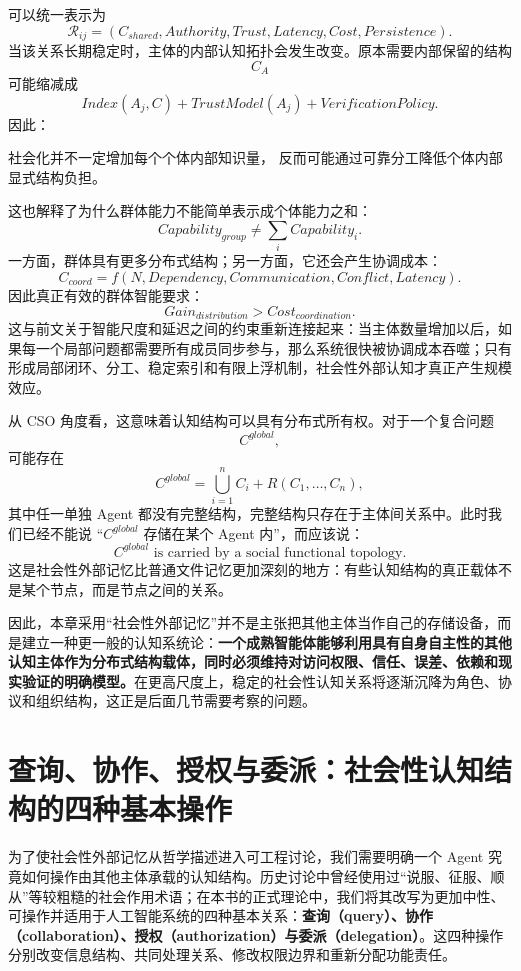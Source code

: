 可以统一表示为
\[
\mathcal R_{ij}
=
(
C_{shared},
Authority,
Trust,
Latency,
Cost,
Persistence
).
\]
当该关系长期稳定时，主体的内部认知拓扑会发生改变。原本需要内部保留的结构
\[
C_A
\]
可能缩减成
\[
Index(A_j,C)
+
TrustModel(A_j)
+
VerificationPolicy.
\]
因此：
\begin{statementbox}
社会化并不一定增加每个个体内部知识量，
反而可能通过可靠分工降低个体内部显式结构负担。
\end{statementbox}

这也解释了为什么群体能力不能简单表示成个体能力之和：
\[
Capability_{group}
\neq
\sum_i Capability_i.
\]
一方面，群体具有更多分布式结构；另一方面，它还会产生协调成本：
\[
C_{coord}
=
f(
N,
Dependency,
Communication,
Conflict,
Latency
).
\]
因此真正有效的群体智能要求：
\[
Gain_{distribution}
>
Cost_{coordination}.
\]
这与前文关于智能尺度和延迟之间的约束重新连接起来：当主体数量增加以后，如果每一个局部问题都需要所有成员同步参与，那么系统很快被协调成本吞噬；只有形成局部闭环、分工、稳定索引和有限上浮机制，社会性外部认知才真正产生规模效应。

从 CSO 角度看，这意味着认知结构可以具有分布式所有权。对于一个复合问题
\[
C^{global},
\]
可能存在
\[
C^{global}
=
\bigcup_{i=1}^{n}
C_i
+
R(C_1,\ldots,C_n),
\]
其中任一单独 Agent 都没有完整结构，完整结构只存在于主体间关系中。此时我们已经不能说 ``$C^{global}$ 存储在某个 Agent 内''，而应该说：
\[
\boxed{
C^{global}
\text{ is carried by a social functional topology.}
}
\]
这是社会性外部记忆比普通文件记忆更加深刻的地方：有些认知结构的真正载体不是某个节点，而是节点之间的关系。

因此，本章采用``社会性外部记忆''并不是主张把其他主体当作自己的存储设备，而是建立一种更一般的认知系统论：\textbf{一个成熟智能体能够利用具有自身自主性的其他认知主体作为分布式结构载体，同时必须维持对访问权限、信任、误差、依赖和现实验证的明确模型。}在更高尺度上，稳定的社会性认知关系将逐渐沉降为角色、协议和组织结构，这正是后面几节需要考察的问题。

\section{查询、协作、授权与委派：社会性认知结构的四种基本操作}

为了使社会性外部记忆从哲学描述进入可工程讨论，我们需要明确一个 Agent 究竟如何操作由其他主体承载的认知结构。历史讨论中曾经使用过``说服、征服、顺从''等较粗糙的社会作用术语；在本书的正式理论中，我们将其改写为更加中性、可操作并适用于人工智能系统的四种基本关系：\textbf{查询（query）、协作（collaboration）、授权（authorization）与委派（delegation）}。这四种操作分别改变信息结构、共同处理关系、修改权限边界和重新分配功能责任。

